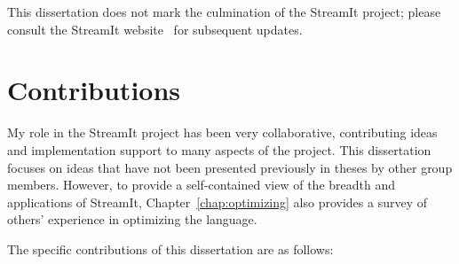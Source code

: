 This dissertation does not mark the culmination of the StreamIt
project; please consult the StreamIt website~\cite{streamitweb} for
subsequent updates.

\section{Contributions}

My role in the StreamIt project has been very collaborative,
contributing ideas and implementation support to many aspects of the
project.  This dissertation focuses on ideas that have not been
presented previously in theses by other group members.  However, to
provide a self-contained view of the breadth and applications of
StreamIt, Chapter~\ref{chap:optimizing} also provides a survey of
others' experience in optimizing the language.

The specific contributions of this dissertation are as follows:

